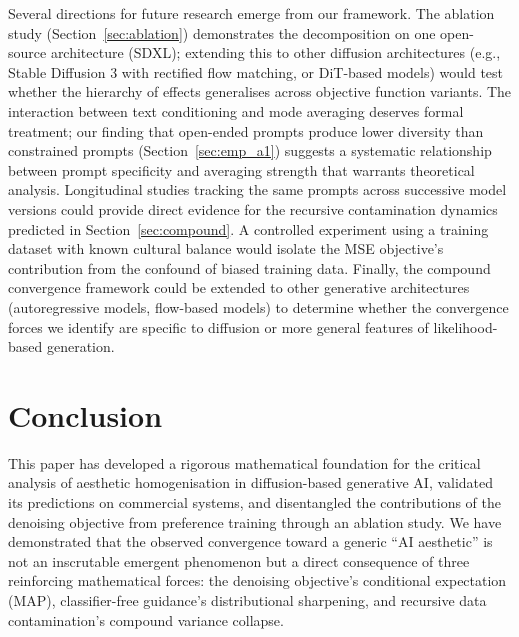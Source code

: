 \documentclass[11pt]{article}
\begin{document}
Several directions for future research emerge from our framework. The ablation study (Section~\ref{sec:ablation}) demonstrates the decomposition on one open-source architecture (SDXL); extending this to other diffusion architectures (e.g., Stable Diffusion 3 with rectified flow matching, or DiT-based models) would test whether the hierarchy of effects generalises across objective function variants. The interaction between text conditioning and mode averaging deserves formal treatment; our finding that open-ended prompts produce lower diversity than constrained prompts (Section~\ref{sec:emp_a1}) suggests a systematic relationship between prompt specificity and averaging strength that warrants theoretical analysis. Longitudinal studies tracking the same prompts across successive model versions could provide direct evidence for the recursive contamination dynamics predicted in Section~\ref{sec:compound}. A controlled experiment using a training dataset with known cultural balance would isolate the MSE objective's contribution from the confound of biased training data. Finally, the compound convergence framework could be extended to other generative architectures (autoregressive models, flow-based models) to determine whether the convergence forces we identify are specific to diffusion or more general features of likelihood-based generation.

\section{Conclusion}

This paper has developed a rigorous mathematical foundation for the critical analysis of aesthetic homogenisation in diffusion-based generative AI, validated its predictions on commercial systems, and disentangled the contributions of the denoising objective from preference training through an ablation study. We have demonstrated that the observed convergence toward a generic ``AI aesthetic'' is not an inscrutable emergent phenomenon but a direct consequence of three reinforcing mathematical forces: the denoising objective's conditional expectation (MAP), classifier-free guidance's distributional sharpening, and recursive data contamination's compound variance collapse.
\end{document}
